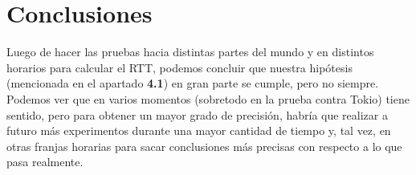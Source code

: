 \section{Conclusiones}

Luego de hacer las pruebas hacia distintas partes del mundo y en distintos horarios para calcular el RTT, podemos concluir que nuestra hipótesis (mencionada en el apartado \textbf{4.1}) en gran parte se cumple, pero no siempre. Podemos ver que en varios momentos (sobretodo en la prueba contra Tokio) tiene sentido, pero para obtener un mayor grado de precisión, habría que realizar a futuro más experimentos durante una mayor cantidad de tiempo y, tal vez, en otras franjas horarias para sacar conclusiones más precisas con respecto a lo que pasa realmente.